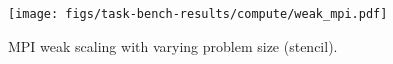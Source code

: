 \begin{figure}[t]
\centering
\texttt{[image: figs/task-bench-results/compute/weak\_mpi.pdf]}
\vspace{-0.7cm}
\caption{MPI weak scaling with varying problem size (stencil).\label{fig:weak-scaling-mpi}}
\vspace{-0.1cm}
\end{figure}
